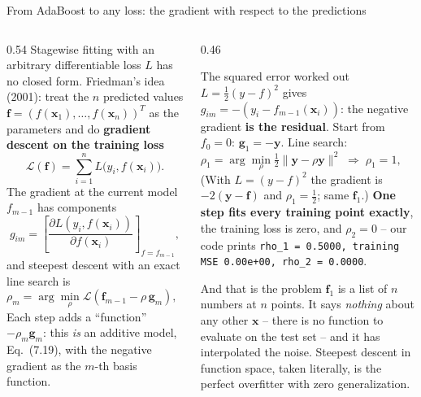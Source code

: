 \documentclass[10pt,aspectratio=169]{beamer}
\begin{document}
\begin{frame}{From AdaBoost to any loss: the gradient with respect to the predictions}
\begin{columns}[T]
\begin{column}{0.54\textwidth}
\footnotesize
Stagewise fitting with an arbitrary differentiable loss $L$ has no closed
form.  Friedman's idea (2001): treat the $n$ predicted values
$\bm{f}=(f(\bm{x}_1),\dots,f(\bm{x}_n))^T$ as the parameters and do
\textbf{gradient descent on the training loss}
\[
\mathcal{L}(\bm{f})=\sum_{i=1}^n L\big(y_i,f(\bm{x}_i)\big).
\]
The gradient at the current model $f_{m-1}$ has components
\[
g_{im}=\left[\frac{\partial L(y_i,f(\bm{x}_i))}{\partial f(\bm{x}_i)}\right]_{f=f_{m-1}},\tag{7.30}
\]
and steepest descent with an exact line search is
\[
\rho_m=\arg\min_\rho\mathcal{L}(\bm{f}_{m-1}-\rho\,\bm{g}_m),\qquad
\bm{f}_m=\bm{f}_{m-1}-\rho_m\bm{g}_m .
\]
Each step adds a ``function'' $-\rho_m\bm{g}_m$: this \emph{is} an additive
model, Eq.\ (7.19), with the negative gradient as the $m$-th basis function.
\end{column}
\begin{column}{0.46\textwidth}
\footnotesize
\begin{block}{The squared error worked out}
$L=\frac12(y-f)^2$ gives $g_{im}=-(y_i-f_{m-1}(\bm{x}_i))$: the negative
gradient \textbf{is the residual}.  Start from $f_0=0$: $\bm{g}_1=-\bm{y}$.
Line search:
\[
\rho_1=\arg\min_\rho\tfrac12\|\bm{y}-\rho\bm{y}\|^2
\;\Rightarrow\;\rho_1=1 ,\qquad \bm{f}_1=\bm{y}.
\]
(With $L=(y-f)^2$ the gradient is $-2(\bm{y}-\bm{f})$ and $\rho_1=\frac12$;
same $\bm{f}_1$.)  \textbf{One step fits every training point exactly}, the
training loss is zero, and $\rho_2=0$ -- our code prints
\texttt{rho\_1 = 0.5000, training MSE 0.00e+00, rho\_2 = 0.0000}.
\end{block}
\begin{block}{And that is the problem}
$\bm{f}_1$ is a list of $n$ numbers at $n$ points.  It says \emph{nothing}
about any other $\bm{x}$ -- there is no function to evaluate on the test set
-- and it has interpolated the noise.  Steepest descent in function space,
taken literally, is the perfect overfitter with zero generalization.
\end{block}
\end{column}
\end{columns}
\end{frame}
\end{document}
